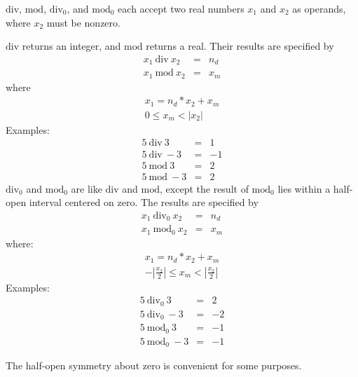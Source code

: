 $\mathrm{div}$, $\mathrm{mod}$, $\mathrm{div}_0$, and $\mathrm{mod}_0$
each accept two real numbers $x_1$ and $x_2$ as operands, where
$x_2$ must be nonzero.

$\mathrm{div}$ returns an integer, and $\mathrm{mod}$ returns a real.
Their results are specified by
%
\begin{eqnarray*}
x_1~\mathrm{div}~x_2 &=& n_d\\
x_1~\mathrm{mod}~x_2 &=& x_m
\end{eqnarray*}
%
where
%
\begin{displaymath}
\begin{array}{c}
x_1 = n_d * x_2 + x_m\\
0 \leq x_m < |x_2|
\end{array}
\end{displaymath}
%
Examples:
\begin{eqnarray*}
5~\mathrm{div}~3    &=&  1\\
5~\mathrm{div}~-3   &=&  -1\\
5~\mathrm{mod}~3    &=&  2\\
5~\mathrm{mod}~-3   &=&  2
\end{eqnarray*}
%
$\mathrm{div}_0$ and $\mathrm{mod}_0$ are like $\mathrm{div}$ and
$\mathrm{mod}$, except the result of $\mathrm{mod}_0$ lies within a
half-open interval centered on zero.  The results are specified by
%
\begin{eqnarray*}
x_1~\mathrm{div}_0~x_2 &=& n_d\\
x_1~\mathrm{mod}_0~x_2 &=& x_m
\end{eqnarray*}
%
where:
%
\begin{displaymath}
\begin{array}{c}
x_1 = n_d * x_2 + x_m\\
-|\frac{x_2}{2}| \leq x_m < |\frac{x_2}{2}|
\end{array}
\end{displaymath}
%
Examples:
%
\begin{eqnarray*}
5~\mathrm{div}_0~3    &=&  2\\
5~\mathrm{div}_0~-3   &=&  -2\\
5~\mathrm{mod}_0~3    &=&  -1\\
5~\mathrm{mod}_0~-3   &=&  -1
\end{eqnarray*}

\begin{rationale}
The half-open symmetry about zero is convenient for some purposes.
\end{rationale}

